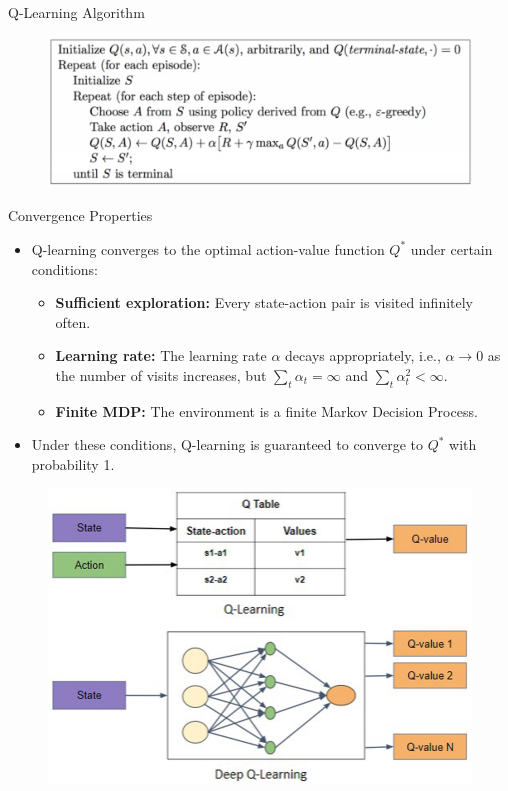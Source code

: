 \begin{frame}{Q-Learning Algorithm}
\begin{figure}
\centering
\includegraphics[width=\textwidth,height=0.9\textheight,keepaspectratio]{images/intro/q_learning.png}
\end{figure}
\end{frame}

\begin{frame}{Convergence Properties}
    \begin{itemize}
        \item Q-learning converges to the optimal action-value function $Q^*$ under certain conditions:
        \begin{itemize}
            \item \textbf{Sufficient exploration:} Every state-action pair is visited infinitely often.
            \item \textbf{Learning rate:} The learning rate $\alpha$ decays appropriately, i.e., $\alpha \to 0$ as the number of visits increases, but $\sum_t \alpha_t = \infty$ and $\sum_t \alpha_t^2 < \infty$.
            \item \textbf{Finite MDP:} The environment is a finite Markov Decision Process.
        \end{itemize}
        \item Under these conditions, Q-learning is guaranteed to converge to $Q^*$ with probability 1.
    \end{itemize}
\end{frame}

\begin{frame}{}
\begin{figure}
\centering
\includegraphics[width=\textwidth,height=0.9\textheight,keepaspectratio]{images/intro/q+deepQ.png}
\end{figure}

\end{frame}